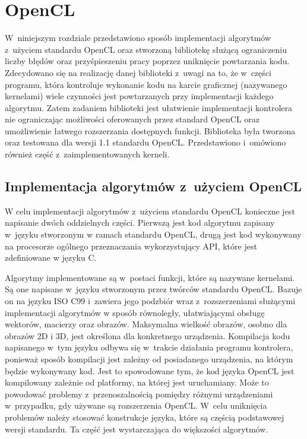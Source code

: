 \chapter{OpenCL}
\label{cha:opencl}

W~niniejszym rozdziale przedstawiono sposób implementacji algorytmów z~użyciem standardu OpenCL oraz stworzoną bibliotekę służącą ograniczeniu liczby błędów oraz przyśpieszeniu pracy poprzez uniknięcie powtarzania kodu. Zdecydowano się na realizację danej biblioteki z~uwagi na to, że w~części programu, która kontroluje wykonanie kodu na karcie graficznej (nazywanego kernelami) wiele czynności jest powtarzanych przy implementacji każdego algorytmu. Zatem zadaniem biblioteki jest ułatwienie implementacji kontrolera nie ograniczając możliwości oferowanych przez standard OpenCL oraz umożliwienie łatwego rozszerzania dostępnych funkcji. Biblioteka była tworzona oraz testowana dla wersji 1.1 standardu OpenCL. Przedstawiono i~omówiono również część z~zaimplementowanych kerneli.

\section{Implementacja algorytmów z~użyciem OpenCL}  
\label{sec:szczegolyOpenCL}

W celu implementacji algorytmów z~użyciem standardu OpenCL konieczne jest napisanie dwóch oddzielnych części. Pierwszą jest kod algorytmu zapisany w~języku stworzonym w ramach standardu OpenCL, drugą jest kod wykonywany na procesorze ogólnego przeznaczania wykorzystujący API, które jest zdefiniowane w języku C.

Algorytmy implementowane są w~postaci funkcji, które są nazywane kernelami. Są one napisane w~języku stworzonym przez twórców standardu OpenCL. Bazuje on na języku ISO C99 i~zawiera jego podzbiór wraz z~rozszerzeniami służącymi implementacji algorytmów w sposób równoległy, ułatwiającymi obsługę wektorów, macierzy oraz obrazów. Maksymalna wielkość obrazów, osobno dla obrazów 2D i 3D, jest określona dla konkretnego urządzenia. Kompilacja kodu napisanego w~tym języku odbywa się w~trakcie działania programu kontrolera, ponieważ sposób kompilacji jest zależny od posiadanego urządzenia, na którym będzie wykonywany kod. Jest to spowodowane tym, że kod języka OpenCL jest kompilowany zależnie od platformy, na której jest uruchamiany. Może to powodować problemy z~przenoszalnością pomiędzy różnymi urządzeniami w~przypadku, gdy używane są rozszerzenia OpenCL. W~celu uniknięcia problemów należy stosować konstrukcje języka, które są częścią podstawowej wersji standardu. Ta część jest wystarczająca do większości algorytmów.


